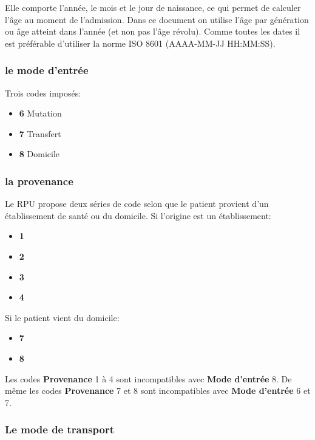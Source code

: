 \documentclass[12pt,english,french,twoside]{book}\usepackage[]{graphicx}\usepackage[]{color}
\begin{document}
Elle comporte l'année, le mois et le jour de naissance, ce qui permet de calculer l'âge au moment de l'admission. Dans ce document on utilise l'âge par génération ou âge atteint dans l'année (et non pas l'âge révolu). Comme toutes les dates il est préférable d'utiliser la norme ISO 8601 (AAAA-MM-JJ HH:MM:SS).

\subsubsection{le mode d'entrée}

Trois codes imposés:
\begin{itemize}
  \item \textbf{6} Mutation
  \item \textbf{7} Transfert
  \item \textbf{8} Domicile
\end{itemize}


\subsubsection{la provenance}

Le RPU propose deux séries de code selon que le patient provient d'un établissement de santé ou du domicile. Si l'origine est un établissement:
\begin{itemize}
  \item \textbf{1}
  \item \textbf{2}
  \item \textbf{3}
  \item \textbf{4}
\end{itemize}
Si le patient vient du domicile:
\begin{itemize}
  \item \textbf{7}
  \item \textbf{8}
\end{itemize}

Les codes \textbf{Provenance} 1 à 4 sont incompatibles avec \textbf{Mode d'entrée} 8. De même les codes \textbf{Provenance} 7 et 8 sont incompatibles avec \textbf{Mode d'entrée} 6 et 7.


\subsubsection{Le mode de transport}
\end{document}
